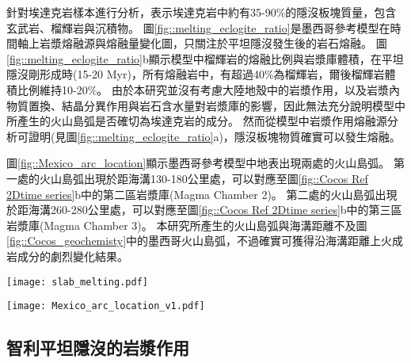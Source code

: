 \citet{stern1996role}針對埃達克岩樣本進行分析，表示埃達克岩中約有35-90$\%$的隱沒板塊質量，包含玄武岩、榴輝岩與沉積物。
圖\ref{fig::melting_eclogite_ratio}是墨西哥參考模型在時間軸上岩漿熔融源與熔融量變化圖，只關注於平坦隱沒發生後的岩石熔融。
圖\ref{fig::melting_eclogite_ratio}b顯示模型中榴輝岩的熔融比例與岩漿庫體積，在平坦隱沒剛形成時(15-20 Myr)，所有熔融岩中，有超過40$\%$為榴輝岩，爾後榴輝岩體積比例維持10-20$\%$。
由於本研究並沒有考慮大陸地殼中的岩漿作用，以及岩漿內物質置換、結晶分異作用與岩石含水量對岩漿庫的影響，因此無法充分說明模型中所產生的火山島弧是否確切為埃達克岩的成分。
然而從模型中岩漿作用熔融源分析可證明(見圖\ref{fig::melting_eclogite_ratio}a)，隱沒板塊物質確實可以發生熔融。

圖\ref{fig::Mexico_arc_location}顯示墨西哥參考模型中地表出現兩處的火山島弧。
第一處的火山島弧出現於距海溝130-180公里處，可以對應至圖\ref{fig::Cocos Ref 2Dtime series}b中的第二區岩漿庫(Magma Chamber 2)。
第二處的火山島弧出現於距海溝260-280公里處，可以對應至圖\ref{fig::Cocos Ref 2Dtime series}b中的第三區岩漿庫(Magma Chamber 3)。
本研究所產生的火山島弧與海溝距離不及圖\ref{fig::Cocos_geochemisty}中的墨西哥火山島弧，不過確實可獲得沿海溝距離上火成岩成分的劇烈變化結果。

\begin{figure*}[ht!]
    \centering
    \texttt{[image: slab\_melting.pdf]}
    \caption[墨西哥參考模型部分熔融源岩與岩漿庫分析]{墨西哥參考模型部分熔融源岩與岩漿庫分析。(a)同圖\ref{fig::Cocos Ref melting time}b，聚焦在13-40 Myr時期的部分熔融源岩，熔融量單位為每單位海溝產生之立方公里量中每20萬年瞬時量，模型中包含橄欖岩(綠色)、沉積岩(橘色)與榴輝岩(深藍色)熔融。灰底為平坦隱沒發生時間。(b)黃底柱狀為岩漿庫體積，藍點為榴輝岩瞬時熔融體積佔整體瞬時熔融體積的比例。
    }
    \label{fig::melting_eclogite_ratio}
\end{figure*}

\begin{figure*}[ht!]
    \centering
    \texttt{[image: Mexico\_arc\_location\_v1.pdf]}
    \caption[墨西哥參考模型火山島弧與海溝距離隨時間變化]{墨西哥參考模型火山島弧與海溝距離隨時間變化。其中咖啡色為熔融源岩以橄欖岩為主的火山島弧，藍色則為熔融源岩以沉積物與榴輝岩為主的火山島弧。
    }
    \label{fig::Mexico_arc_location}
\end{figure*}

\newpage
\subsection{智利平坦隱沒的岩漿作用}

